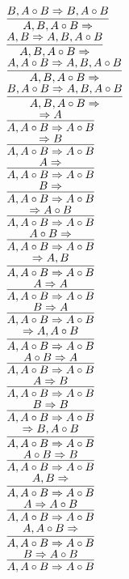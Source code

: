\documentclass[11pt]{article}
\begin{document}
\begin{center}
\bigskip
\\$\infer{A, B, A\circ B\Rightarrow }{B, A\circ B\Rightarrow B, A\circ B}$
\bigskip
\\$\infer{A, B, A\circ B\Rightarrow }{A, B\Rightarrow A, B, A\circ B}$
\bigskip
\\$\infer{A, B, A\circ B\Rightarrow }{A, A\circ B\Rightarrow A, B, A\circ B}$
\bigskip
\\$\infer{A, B, A\circ B\Rightarrow }{B, A\circ B\Rightarrow A, B, A\circ B}$
\bigskip
\\$\infer{A, A\circ B\Rightarrow A\circ B}{\Rightarrow A}$
\bigskip
\\$\infer{A, A\circ B\Rightarrow A\circ B}{\Rightarrow B}$
\bigskip
\\$\infer{A, A\circ B\Rightarrow A\circ B}{A\Rightarrow }$
\bigskip
\\$\infer{A, A\circ B\Rightarrow A\circ B}{B\Rightarrow }$
\bigskip
\\$\infer{A, A\circ B\Rightarrow A\circ B}{\Rightarrow A\circ B}$
\bigskip
\\$\infer{A, A\circ B\Rightarrow A\circ B}{A\circ B\Rightarrow }$
\bigskip
\\$\infer{A, A\circ B\Rightarrow A\circ B}{\Rightarrow A, B}$
\bigskip
\\$\infer{A, A\circ B\Rightarrow A\circ B}{A\Rightarrow A}$
\bigskip
\\$\infer{A, A\circ B\Rightarrow A\circ B}{B\Rightarrow A}$
\bigskip
\\$\infer{A, A\circ B\Rightarrow A\circ B}{\Rightarrow A, A\circ B}$
\bigskip
\\$\infer{A, A\circ B\Rightarrow A\circ B}{A\circ B\Rightarrow A}$
\bigskip
\\$\infer{A, A\circ B\Rightarrow A\circ B}{A\Rightarrow B}$
\bigskip
\\$\infer{A, A\circ B\Rightarrow A\circ B}{B\Rightarrow B}$
\bigskip
\\$\infer{A, A\circ B\Rightarrow A\circ B}{\Rightarrow B, A\circ B}$
\bigskip
\\$\infer{A, A\circ B\Rightarrow A\circ B}{A\circ B\Rightarrow B}$
\bigskip
\\$\infer{A, A\circ B\Rightarrow A\circ B}{A, B\Rightarrow }$
\bigskip
\\$\infer{A, A\circ B\Rightarrow A\circ B}{A\Rightarrow A\circ B}$
\bigskip
\\$\infer{A, A\circ B\Rightarrow A\circ B}{A, A\circ B\Rightarrow }$
\bigskip
\\$\infer{A, A\circ B\Rightarrow A\circ B}{B\Rightarrow A\circ B}$

\end{center}
\end{document}
